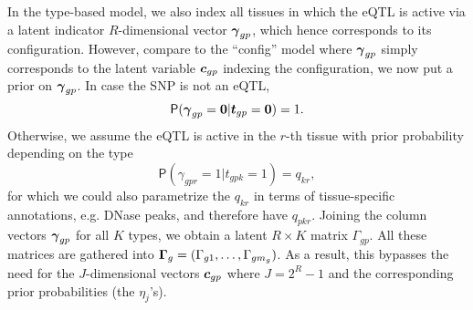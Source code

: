 \documentclass[10pt]{article}
\newcommand{\Prd}{\mathsf{P}} %
\newcommand{\cv}{\mbox{\boldmath$c$}}
\newcommand{\tv}{\mbox{\boldmath$t$}}
\newcommand{\gav}{\mbox{\boldmath$\gamma$}}
\newcommand{\Gav}{\mbox{\boldmath$\Gamma$}}
\begin{document}
In the type-based model, we also index all tissues in which the eQTL is active via a latent indicator $R$-dimensional vector $\gav_{gp}$, which hence corresponds to its configuration.
However, compare to the ``config'' model where $\gav_{gp}$ simply corresponds to the latent variable $\cv_{gp}$ indexing the configuration, we now put a prior on $\gav_{gp}$.
In case the SNP is not an eQTL,
\begin{equation}
  \Prd(\gav_{gp} = \bm{0}  | \tv_{gp} = \bm{0}) = 1.
\end{equation}
Otherwise, we assume the eQTL is active in the $r$-th tissue with prior probability depending on the type
\begin{equation}
  \Prd(\gamma_{gpr} = 1 | t_{gpk} = 1) = q_{kr},
\end{equation}
for which we could also parametrize the $q_{kr}$ in terms of tissue-specific annotations, e.g. DNase peaks, and therefore have $q_{pkr}$.
Joining the column vectors $\gav_{gp}$ for all $K$ types, we obtain a latent $R \times K$ matrix $\Gamma_{gp}$.
All these matrices are gathered into $\Gav_g = (\Gamma_{g1},\ldots,\Gamma_{gm_g})$.
As a result, this bypasses the need for the $J$-dimensional vectors $\cv_{gp}$ where $J=2^R-1$ and the corresponding prior probabilities (the $\eta_j$'s).

\end{document}
